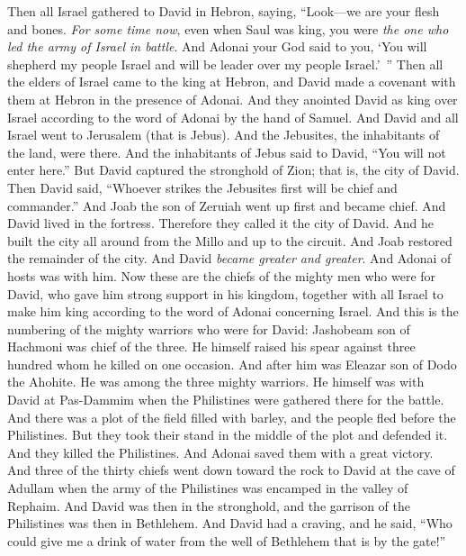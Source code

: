 \begin{biblechapter} %
 Then all Israel gathered to David in Hebron, saying, “Look—we are your flesh and bones.
\verse \textit{For some time now}, even when Saul was king, you were \textit{the one who led the army of Israel in battle}. And Adonai your God said to you, ‘You will shepherd my people Israel and will be leader over my people Israel.’ ”
\verse Then all the elders of Israel came to the king at Hebron, and David made a covenant with them at Hebron in the presence of Adonai. And they anointed David as king over Israel according to the word of Adonai by the hand of Samuel.
\verse And David and all Israel went to Jerusalem (that is Jebus). And the Jebusites, the inhabitants of the land, were there.
\verse And the inhabitants of Jebus said to David, “You will not enter here.” But David captured the stronghold of Zion; that is, the city of David.
\verse Then David said, “Whoever strikes the Jebusites first will be chief and commander.” And Joab the son of Zeruiah went up first and became chief.
\verse And David lived in the fortress. Therefore they called it the city of David.
\verse And he built the city all around from the Millo and up to the circuit. And Joab restored the remainder of the city.
\verse And David \textit{became greater and greater}. And Adonai of hosts was with him.
 Now these are the chiefs of the mighty men who were for David, who gave him strong support in his kingdom, together with all Israel to make him king according to the word of Adonai concerning Israel.
\verse And this is the numbering of the mighty warriors who were for David: Jashobeam son of Hachmoni was chief of the three. He himself raised his spear against three hundred whom he killed on one occasion.
\verse And after him was Eleazar son of Dodo the Ahohite. He was among the three mighty warriors.
\verse He himself was with David at Pas-Dammim when the Philistines were gathered there for the battle. And there was a plot of the field filled with barley, and the people fled before the Philistines.
\verse But they took their stand in the middle of the plot and defended it. And they killed the Philistines. And Adonai saved them with a great victory.
\verse And three of the thirty chiefs went down toward the rock to David at the cave of Adullam when the army of the Philistines was encamped in the valley of Rephaim.
\verse And David was then in the stronghold, and the garrison of the Philistines was then in Bethlehem.
\verse And David had a craving, and he said, “Who could give me a drink of water from the well of Bethlehem that is by the gate!”

\end{biblechapter}
